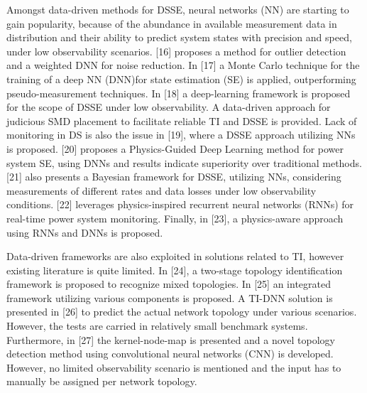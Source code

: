 \documentclass[journal]{IEEEtran}  %
\begin{document}
Amongst data-driven methods for DSSE, neural networks (NN) are starting to gain popularity, because of the abundance in available measurement data in distribution and their ability to predict system states with precision and speed, under low observability scenarios. [16] proposes a method for outlier detection and a weighted DNN for noise reduction. In [17] a Monte Carlo technique for the training of a deep NN (DNN)for state estimation (SE) is applied, outperforming pseudo-measurement techniques. In [18] a deep-learning framework is proposed for the scope of DSSE under low observability. A data-driven approach for judicious SMD placement to facilitate reliable TI and DSSE is provided. Lack of monitoring in DS is also the issue in [19], where a DSSE approach utilizing NNs is proposed. [20] proposes a Physics-Guided Deep Learning method for power system SE, using DNNs and results indicate superiority over traditional methods. [21] also presents a Bayesian framework for DSSE, utilizing NNs, considering measurements of different rates and data losses under low observability conditions. [22] leverages physics-inspired recurrent neural networks (RNNs) for real-time power system monitoring. Finally, in [23], a physics-aware approach using RNNs and DNNs is proposed.

Data-driven frameworks are also exploited in solutions related to TI, however existing literature is quite limited. In [24], a two-stage topology identification framework is proposed to recognize mixed topologies. In [25] an integrated framework utilizing various components is proposed. A TI-DNN solution is presented in [26] to predict the actual network topology under various scenarios. However, the tests are carried in relatively small benchmark systems. Furthermore, in [27] the kernel-node-map is presented and a novel topology detection method using convolutional neural networks (CNN) is developed. However, no limited observability scenario is mentioned and the input has to manually be assigned per network topology.
\end{document}
